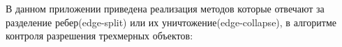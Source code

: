 \documentclass[14pt]{article}
\numberwithin{figure}{section}
\numberwithin{equation}{section}
\begin{document}
В данном приложении приведена реализация методов которые отвечают за разделение ребер(edge-split) или их уничтожение(edge-collapse), в алгоритме контроля разрешения трехмерных объектов:



%

\end{document}
